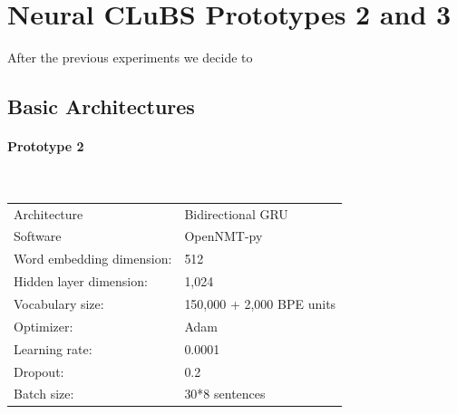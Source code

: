 \documentclass[a4paper,11pt]{article}
\begin{document}


\section{Neural CLuBS Prototypes 2 and 3}
\label{s:finalNMT}

After the previous experiments we decide to 

\subsection{Basic Architectures}

\paragraph{Prototype 2} ~\\

\begin{tabular}{ll}
Architecture & Bidirectional GRU \\
Software & OpenNMT-py \\
Word embedding dimension: & 512\\
Hidden layer dimension: & 1,024\\
Vocabulary size: & 150,000 + 2,000 BPE units\\
Optimizer: & Adam\\
Learning rate: & 0.0001\\
Dropout: & 0.2\\
Batch size: & 30*8 sentences\\
\end{tabular}
% 
\end{document}
